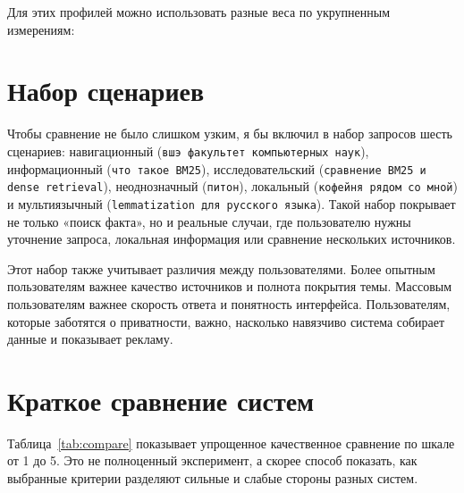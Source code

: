 \documentclass[10pt]{article}
\begin{document}
Для этих профилей можно использовать разные веса по укрупненным измерениям:
\begin{table}[t]
\centering
\footnotesize
\setlength{\tabcolsep}{2.2pt}
\renewcommand{\arraystretch}{1.08}
\caption{Веса укрупненных измерений для разных профилей задач.}
\label{tab:weights}
\end{table}

\section{Набор сценариев}
Чтобы сравнение не было слишком узким, я бы включил в набор запросов шесть сценариев: навигационный (\texttt{вшэ факультет компьютерных наук}), информационный (\texttt{что такое BM25}), исследовательский (\texttt{сравнение BM25 и dense retrieval}), неоднозначный (\texttt{питон}), локальный (\texttt{кофейня рядом со мной}) и мультиязычный (\texttt{lemmatization для русского языка}). Такой набор покрывает не только «поиск факта», но и реальные случаи, где пользователю нужны уточнение запроса, локальная информация или сравнение нескольких источников.

Этот набор также учитывает различия между пользователями. Более опытным пользователям важнее качество источников и полнота покрытия темы. Массовым пользователям важнее скорость ответа и понятность интерфейса. Пользователям, которые заботятся о приватности, важно, насколько навязчиво система собирает данные и показывает рекламу.

\section{Краткое сравнение систем}
Таблица~\ref{tab:compare} показывает упрощенное качественное сравнение по шкале от 1 до 5. Это не полноценный эксперимент, а скорее способ показать, как выбранные критерии разделяют сильные и слабые стороны разных систем.
\end{document}
